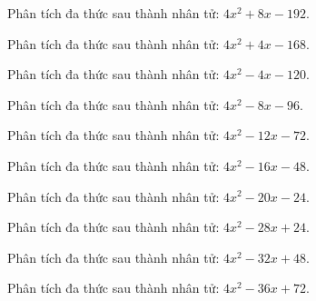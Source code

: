 \begin{bt}
	Phân tích đa thức sau thành nhân tử: $4 x^2 + 8 x - 192$.
\end{bt}
\begin{bt}
	Phân tích đa thức sau thành nhân tử: $4 x^2 + 4 x - 168$.
\end{bt}
\begin{bt}
	Phân tích đa thức sau thành nhân tử: $4 x^2 - 4 x - 120$.
\end{bt}
\begin{bt}
	Phân tích đa thức sau thành nhân tử: $4 x^2 - 8 x - 96$.
\end{bt}
\begin{bt}
	Phân tích đa thức sau thành nhân tử: $4 x^2 - 12 x - 72$.
\end{bt}
\begin{bt}
	Phân tích đa thức sau thành nhân tử: $4 x^2 - 16 x - 48$.
\end{bt}
\begin{bt}
	Phân tích đa thức sau thành nhân tử: $4 x^2 - 20 x - 24$.
\end{bt}
\begin{bt}
	Phân tích đa thức sau thành nhân tử: $4 x^2 - 28 x + 24$.
\end{bt}
\begin{bt}
	Phân tích đa thức sau thành nhân tử: $4 x^2 - 32 x + 48$.
\end{bt}
\begin{bt}
	Phân tích đa thức sau thành nhân tử: $4 x^2 - 36 x + 72$.
\end{bt}
